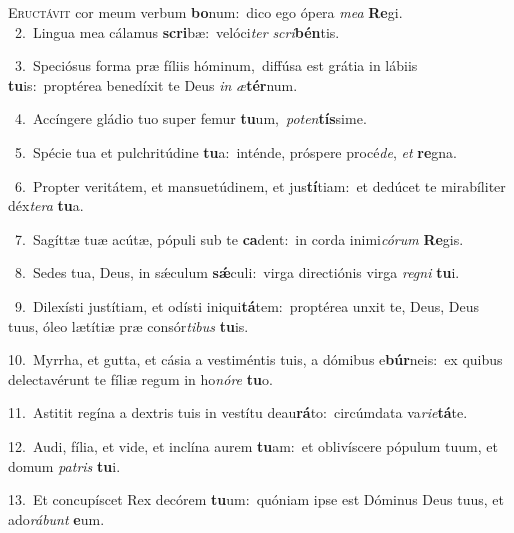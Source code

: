 \lettrine{\initial\textcolor{\initialcolor}{E}}{ructávit} cor meum verbum \textbf{bo}\-num:~\star dico ego ópera \textit{me}\-\textit{a} \textbf{Re}\-gi.\\
{\numbfont\textcolor{\numbcolor}{~2.}}~Lingua mea cálamus \textbf{scri}\-bæ:~\star velóci\textit{ter} \textit{scri}\-\textbf{bén}tis.\par
{\numbfont\textcolor{\numbcolor}{~3.}}~Speciósus forma præ fíliis hóminum,~\dagger diffúsa est grátia in lábiis \textbf{tu}\-is:~\star proptérea benedíxit te Deus \textit{in} \textit{æ}\-\textbf{tér}num.\par
{\numbfont\textcolor{\numbcolor}{~4.}}~Accíngere gládio tuo super femur \textbf{tu}\-um,~\star \textit{pot}\-\textit{en}\textbf{tís}sime.\par
{\numbfont\textcolor{\numbcolor}{~5.}}~Spécie tua et pulchritúdine \textbf{tu}\-a:~\star inténde, próspere procé\-\textit{de}\-, \textit{et} \textbf{re}\-gna.\par
{\numbfont\textcolor{\numbcolor}{~6.}}~Propter veritátem, et mansuetúdinem, et jus\-\textbf{tí}\-tiam:~\star et dedúcet te mirabíliter déx\-\textit{te}\-\textit{ra} \textbf{tu}\-a.\par
{\numbfont\textcolor{\numbcolor}{~7.}}~Sagíttæ tuæ acútæ, pópuli sub te \textbf{ca}\-dent:~\star in corda inimi\-\textit{có}\-\textit{rum} \textbf{Re}\-gis.\par
{\numbfont\textcolor{\numbcolor}{~8.}}~Sedes tua, Deus, in sǽculum \textbf{sǽ}\-culi:~\star virga directiónis virga \textit{re}\-\textit{gni} \textbf{tu}\-i.\par
{\numbfont\textcolor{\numbcolor}{~9.}}~Dilexísti justítiam, et odísti iniqui\-\textbf{tá}\-tem:~\star proptérea unxit te, Deus, Deus tuus, óleo lætítiæ præ consór\-\textit{ti}\-\textit{bus} \textbf{tu}\-is.\par
{\numbfont\textcolor{\numbcolor}{10.}}~Myrrha, et gutta, et cásia a vestiméntis tuis, a dómibus e\-\textbf{búr}\-neis:~\star ex quibus delectavérunt te fíliæ regum in ho\-\textit{nó}\-\textit{re} \textbf{tu}\-o.\par
{\numbfont\textcolor{\numbcolor}{11.}}~Astitit regína a dextris tuis in vestítu deau\-\textbf{rá}\-to:~\star circúmdata va\-\textit{ri}\-\textit{e}\textbf{tá}te.\par
{\numbfont\textcolor{\numbcolor}{12.}}~Audi, fília, et vide, et inclína aurem \textbf{tu}\-am:~\star et oblivíscere pópulum tuum, et domum \textit{pa}\-\textit{tris} \textbf{tu}\-i.\par
{\numbfont\textcolor{\numbcolor}{13.}}~Et concupíscet Rex decórem \textbf{tu}\-um:~\star quóniam ipse est Dóminus Deus tuus, et ado\-\textit{rá}\-\textit{bunt} \textbf{e}\-um.\par
